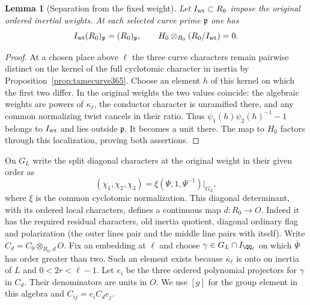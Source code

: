 \documentclass[a4paper,11pt]{article}
\newtheorem{lemma}[proposition]{Lemma}
\theoremstyle{definition}
\theoremstyle{remark}
\numberwithin{equation}{section}
\begin{document}
\begin{lemma}[Separation from the fixed weight]\leavevmode
\label{lem:weightseparation415}
Let \(I_{\rm wt}\subset R_0\) impose the original ordered
inertial weights. At each selected curve prime \(\mathfrak p\)
one has
\[
         I_{\rm wt}(R_0)_{\mathfrak p}=(R_0)_{\mathfrak p},
               \qquad H_0\otimes_{R_0}(R_0/I_{\rm wt})=0 .
\]
\end{lemma}
\begin{proof}
At a chosen place above \(\ell\) the three curve characters
remain pairwise distinct on the kernel of the full cyclotomic
character in inertia by Proposition~\ref{prop:tamecurve365}.
Choose an element \(h\) of this kernel on which the first two
differ. In the original weights the two values coincide:
the algebraic weights are powers of \(\kappa_\ell\), the
conductor character is unramified there, and any common
normalizing twist cancels in their ratio. Thus
\(\psi_1(h)\psi_2(h)^{-1}-1\) belongs to \(I_{\rm wt}\)
and lies outside \(\mathfrak p\). It becomes a unit there.
The map to \(H_0\) factors through this localization,
proving both assertions.
\end{proof}

On \(G_L\) write the split diagonal characters at the original
weight in their given order as
\[
        (\chi_1,\chi_2,\chi_3)=\xi(\Psi,1,\Psi^{-1})|_{G_L},
\]
where \(\xi\) is the common cyclotomic normalization.
This diagonal determinant, with its ordered local characters,
defines a continuous map \(d:R_0\to O\). Indeed it has the
required residual characters, old inertia quotient, diagonal
ordinary flag and polarization (the outer lines pair and the
middle line pairs with itself). Write \(C_d=C_0\otimes_{R_0,d}O\).
Fix an embedding at \(\ell\) and choose
\(\gamma\in G_L\cap I_{\QQ_\ell}\) on which \(\bar\Psi\)
has order greater than two. Such an element exists because
\(\bar\kappa_\ell\) is onto on inertia of \(L\) and
\(0<2r<\ell-1\). Let \(e_i\) be the three ordered polynomial
projectors for \(\gamma\) in \(C_d\). Their denominators are
units in \(O\). We use \([g]\) for the group element in this
algebra and \(C_{ij}=e_i C_d e_j\).
\end{document}
